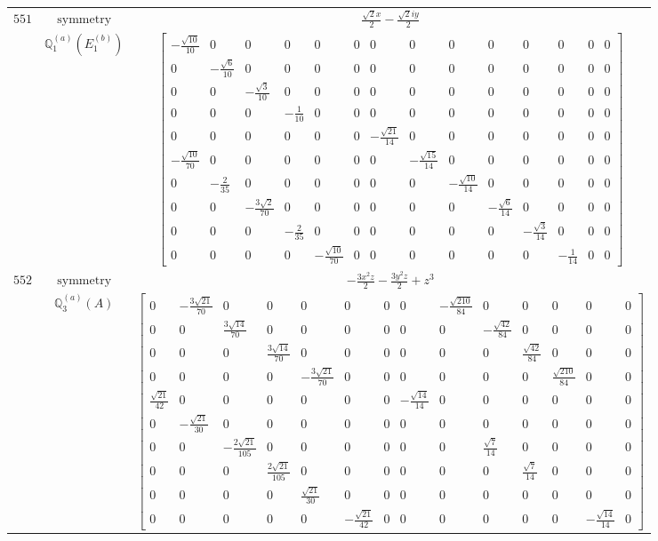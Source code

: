 \documentclass[fleqn,8pt,landscape]{jsarticle}
\begin{document}
\begin{longtable}{ccc}
$ 551 $ & $ \text{symmetry} $ & $ \frac{\sqrt{2} x}{2} - \frac{\sqrt{2} i y}{2} $ \\
$  $ & $ \mathbb{Q}_{1}^{(a)}(E_{1}^{(b)}) $ & $ \begin{bmatrix} - \frac{\sqrt{10}}{10} & 0 & 0 & 0 & 0 & 0 & 0 & 0 & 0 & 0 & 0 & 0 & 0 & 0 \\ 0 & - \frac{\sqrt{6}}{10} & 0 & 0 & 0 & 0 & 0 & 0 & 0 & 0 & 0 & 0 & 0 & 0 \\ 0 & 0 & - \frac{\sqrt{3}}{10} & 0 & 0 & 0 & 0 & 0 & 0 & 0 & 0 & 0 & 0 & 0 \\ 0 & 0 & 0 & - \frac{1}{10} & 0 & 0 & 0 & 0 & 0 & 0 & 0 & 0 & 0 & 0 \\ 0 & 0 & 0 & 0 & 0 & 0 & - \frac{\sqrt{21}}{14} & 0 & 0 & 0 & 0 & 0 & 0 & 0 \\ - \frac{\sqrt{10}}{70} & 0 & 0 & 0 & 0 & 0 & 0 & - \frac{\sqrt{15}}{14} & 0 & 0 & 0 & 0 & 0 & 0 \\ 0 & - \frac{2}{35} & 0 & 0 & 0 & 0 & 0 & 0 & - \frac{\sqrt{10}}{14} & 0 & 0 & 0 & 0 & 0 \\ 0 & 0 & - \frac{3 \sqrt{2}}{70} & 0 & 0 & 0 & 0 & 0 & 0 & - \frac{\sqrt{6}}{14} & 0 & 0 & 0 & 0 \\ 0 & 0 & 0 & - \frac{2}{35} & 0 & 0 & 0 & 0 & 0 & 0 & - \frac{\sqrt{3}}{14} & 0 & 0 & 0 \\ 0 & 0 & 0 & 0 & - \frac{\sqrt{10}}{70} & 0 & 0 & 0 & 0 & 0 & 0 & - \frac{1}{14} & 0 & 0 \end{bmatrix} $ \\ \hline
$ 552 $ & $ \text{symmetry} $ & $ - \frac{3 x^{2} z}{2} - \frac{3 y^{2} z}{2} + z^{3} $ \\
$  $ & $ \mathbb{Q}_{3}^{(a)}(A) $ & $ \begin{bmatrix} 0 & - \frac{3 \sqrt{21}}{70} & 0 & 0 & 0 & 0 & 0 & 0 & - \frac{\sqrt{210}}{84} & 0 & 0 & 0 & 0 & 0 \\ 0 & 0 & \frac{3 \sqrt{14}}{70} & 0 & 0 & 0 & 0 & 0 & 0 & - \frac{\sqrt{42}}{84} & 0 & 0 & 0 & 0 \\ 0 & 0 & 0 & \frac{3 \sqrt{14}}{70} & 0 & 0 & 0 & 0 & 0 & 0 & \frac{\sqrt{42}}{84} & 0 & 0 & 0 \\ 0 & 0 & 0 & 0 & - \frac{3 \sqrt{21}}{70} & 0 & 0 & 0 & 0 & 0 & 0 & \frac{\sqrt{210}}{84} & 0 & 0 \\ \frac{\sqrt{21}}{42} & 0 & 0 & 0 & 0 & 0 & 0 & - \frac{\sqrt{14}}{14} & 0 & 0 & 0 & 0 & 0 & 0 \\ 0 & - \frac{\sqrt{21}}{30} & 0 & 0 & 0 & 0 & 0 & 0 & 0 & 0 & 0 & 0 & 0 & 0 \\ 0 & 0 & - \frac{2 \sqrt{21}}{105} & 0 & 0 & 0 & 0 & 0 & 0 & \frac{\sqrt{7}}{14} & 0 & 0 & 0 & 0 \\ 0 & 0 & 0 & \frac{2 \sqrt{21}}{105} & 0 & 0 & 0 & 0 & 0 & 0 & \frac{\sqrt{7}}{14} & 0 & 0 & 0 \\ 0 & 0 & 0 & 0 & \frac{\sqrt{21}}{30} & 0 & 0 & 0 & 0 & 0 & 0 & 0 & 0 & 0 \\ 0 & 0 & 0 & 0 & 0 & - \frac{\sqrt{21}}{42} & 0 & 0 & 0 & 0 & 0 & 0 & - \frac{\sqrt{14}}{14} & 0 \end{bmatrix} $ \\ \hline

\end{longtable}
\end{document}

